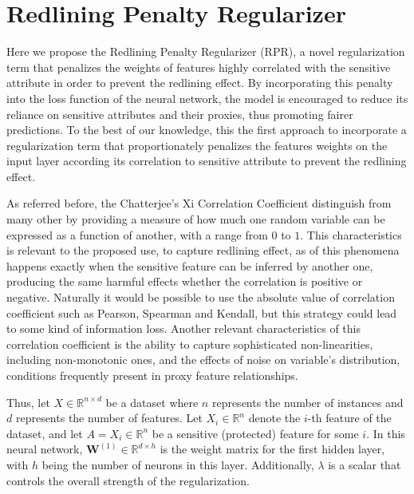 \section{Redlining Penalty Regularizer} \label{sec:rpr_proposal}

Here we propose the Redlining Penalty Regularizer (RPR), a novel regularization term that penalizes the weights of features highly correlated with the sensitive attribute in order to prevent the redlining effect. By incorporating this penalty into the loss function of the neural network, the model is encouraged to reduce its reliance on sensitive attributes and their proxies, thus promoting fairer predictions. To the best of our knowledge, this the first approach to incorporate a regularization term that proportionately penalizes the features weights on the input layer according its correlation to sensitive attribute to prevent the redlining effect.

As referred before, the Chatterjee's Xi Correlation Coefficient distinguish from many other by providing a measure of how much one random variable can be expressed as a function of another, with a range from $0$ to $1$. This characteristics is relevant to the proposed use, to capture redlining effect, as of this phenomena happens exactly when the sensitive feature can be inferred by another one, producing the same harmful effects whether the correlation is positive or negative. Naturally it would be possible to use the absolute value of correlation coefficient such as Pearson, Spearman and Kendall, but this strategy could lead to some kind of information loss. Another relevant characteristics of this correlation coefficient is the ability to capture sophisticated non-linearities, including non-monotonic ones, and the effects of noise on variable's distribution, conditions frequently present in proxy feature relationships. 

Thus, let $X \in \mathbb{R}^{n \times d}$ be a dataset where $n$ represents the number of instances and $d$ represents the number of features. Let $X_i \in \mathbb{R}^n$ denote the $i$-th feature of the dataset, and let $A = X_i \in \mathbb{R}^n$ be a sensitive (protected) feature for some $i$. In this neural network, $\mathbf{W}^{(1)} \in \mathbb{R}^{d \times h}$ is the weight matrix for the first hidden layer, with $h$ being the number of neurons in this layer. Additionally, $\lambda$ is a scalar that controls the overall strength of the regularization.

